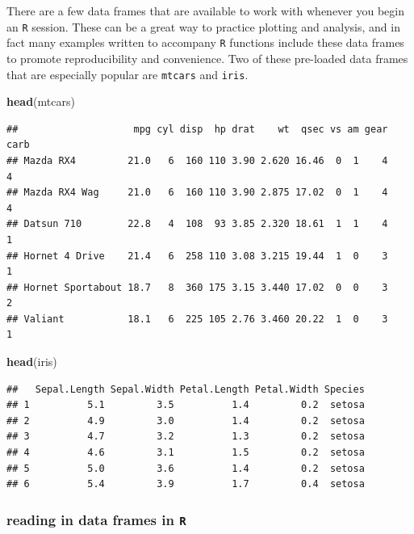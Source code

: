 \documentclass[]{book}
\newenvironment{Shaded}{\begin{snugshade}}{\end{snugshade}}
\newcommand{\KeywordTok}[1]{\textcolor[rgb]{0.13,0.29,0.53}{\textbf{#1}}}
\newcommand{\NormalTok}[1]{#1}
\begin{document}
There are a few data frames that are available to work with whenever you begin an \texttt{R} session. These can be a great way to practice plotting and analysis, and in fact many examples written to accompany \texttt{R} functions include these data frames to promote reproducibility and convenience. Two of these pre-loaded data frames that are especially popular are \texttt{mtcars} and \texttt{iris}.

\begin{Shaded}
\begin{Highlighting}[]
\KeywordTok{head}\NormalTok{(mtcars)}
\end{Highlighting}
\end{Shaded}

\begin{verbatim}
##                    mpg cyl disp  hp drat    wt  qsec vs am gear carb
## Mazda RX4         21.0   6  160 110 3.90 2.620 16.46  0  1    4    4
## Mazda RX4 Wag     21.0   6  160 110 3.90 2.875 17.02  0  1    4    4
## Datsun 710        22.8   4  108  93 3.85 2.320 18.61  1  1    4    1
## Hornet 4 Drive    21.4   6  258 110 3.08 3.215 19.44  1  0    3    1
## Hornet Sportabout 18.7   8  360 175 3.15 3.440 17.02  0  0    3    2
## Valiant           18.1   6  225 105 2.76 3.460 20.22  1  0    3    1
\end{verbatim}

\begin{Shaded}
\begin{Highlighting}[]
\KeywordTok{head}\NormalTok{(iris)}
\end{Highlighting}
\end{Shaded}

\begin{verbatim}
##   Sepal.Length Sepal.Width Petal.Length Petal.Width Species
## 1          5.1         3.5          1.4         0.2  setosa
## 2          4.9         3.0          1.4         0.2  setosa
## 3          4.7         3.2          1.3         0.2  setosa
## 4          4.6         3.1          1.5         0.2  setosa
## 5          5.0         3.6          1.4         0.2  setosa
## 6          5.4         3.9          1.7         0.4  setosa
\end{verbatim}

\hypertarget{reading-in-data-frames-in-r}{%
\subsubsection{\texorpdfstring{reading in data frames in \texttt{R}}{reading in data frames in R}}\label{reading-in-data-frames-in-r}}
\end{document}
